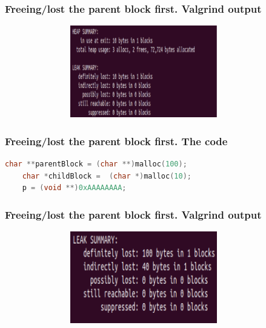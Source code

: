 \documentclass{bredelebeamer}
\begin{document}
\begin{frame}[fragile]
	\frametitle{Freeing/lost the parent block first. Valgrind output}
	\begin{center}
		\begin{figure}
			\includegraphics[height=4cm,width=10cm]{freeing-parent-block-first-valgrind.png}
		\end{figure}
	\end{center}
\end{frame}

\begin{frame}[fragile]
\frametitle{Freeing/lost the parent block first. The code} 
	\begin{center}
		\begin{lstlisting}[language=C++]
	char **parentBlock = (char **)malloc(100);
	char *childBlock =  (char *)malloc(10);
	p = (void **)0xAAAAAAAA;
		\end{lstlisting}
	\end{center}
\end{frame}

\begin{frame}[fragile]
	\frametitle{Freeing/lost the parent block first. Valgrind output}
	\begin{center}
		\begin{figure}
			\includegraphics[height=4cm,width=10cm]{freeing-parent-block-first-valgrind-indir.png}
		\end{figure}
	\end{center}
\end{frame}
\end{document}
